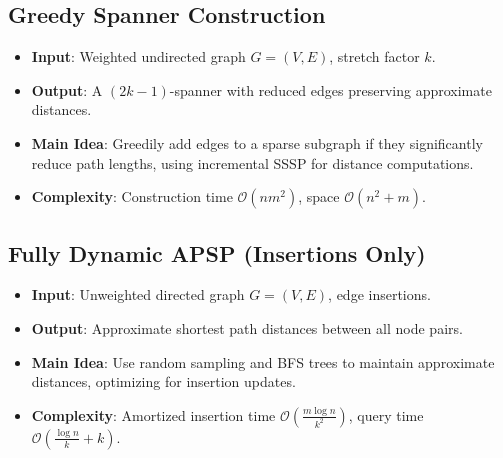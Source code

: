 \documentclass[11pt]{article}
\begin{document}
\subsection{Greedy Spanner Construction}
\begin{itemize}
    \item \textbf{Input}: Weighted undirected graph $G=(V,E)$, stretch factor $k$.
    \item \textbf{Output}: A $(2k-1)$-spanner with reduced edges preserving approximate distances.
    \item \textbf{Main Idea}: Greedily add edges to a sparse subgraph if they significantly reduce path lengths, using incremental SSSP for distance computations.
    \item \textbf{Complexity}: Construction time $\mathcal{O}(nm^2)$, space $\mathcal{O}(n^2+m)$.
\end{itemize}

\subsection{Fully Dynamic APSP (Insertions Only)}
\begin{itemize}
    \item \textbf{Input}: Unweighted directed graph $G=(V,E)$, edge insertions.
    \item \textbf{Output}: Approximate shortest path distances between all node pairs.
    \item \textbf{Main Idea}: Use random sampling and BFS trees to maintain approximate distances, optimizing for insertion updates.
    \item \textbf{Complexity}: Amortized insertion time $\mathcal{O}\left(\frac{m \log n}{k^2}\right)$, query time $\mathcal{O}\left(\frac{\log n}{k}+k\right)$.
\end{itemize}
\end{document}
